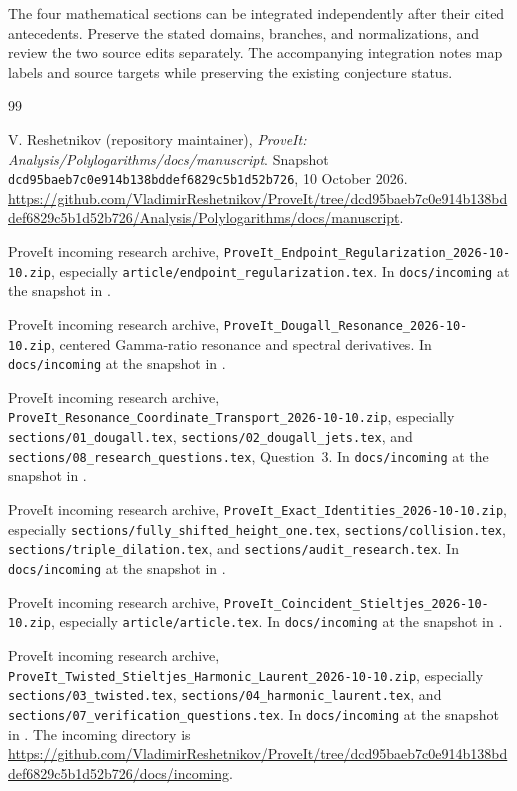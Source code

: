 \documentclass[11pt,a4paper]{article}
\numberwithin{equation}{section}
\theoremstyle{definition}
\theoremstyle{remark}
\newcommand{\src}[1]{\nolinkurl{#1}}
\begin{document}
The four mathematical sections can be integrated independently after
their cited antecedents. Preserve the stated domains, branches, and
normalizations, and review the two source edits separately.
The accompanying integration notes map labels and source targets
while preserving the existing conjecture status.

\clearpage
\begin{thebibliography}{99}
\raggedright
{}

V. Reshetnikov (repository maintainer),
\emph{ProveIt: Analysis/Polylogarithms/docs/manuscript}.
Snapshot \src{dcd95baeb7c0e914b138bddef6829c5b1d52b726},
10 October 2026.
\url{https://github.com/VladimirReshetnikov/ProveIt/tree/dcd95baeb7c0e914b138bddef6829c5b1d52b726/Analysis/Polylogarithms/docs/manuscript}.

ProveIt incoming research archive,
\src{ProveIt_Endpoint_Regularization_2026-10-10.zip},
especially \src{article/endpoint_regularization.tex}.
In \src{docs/incoming} at the snapshot in \cite{RepoMain}.

ProveIt incoming research archive,
\src{ProveIt_Dougall_Resonance_2026-10-10.zip},
centered Gamma-ratio resonance and spectral derivatives.
In \src{docs/incoming} at the snapshot in \cite{RepoMain}.

ProveIt incoming research archive,
\src{ProveIt_Resonance_Coordinate_Transport_2026-10-10.zip},
especially \src{sections/01_dougall.tex},
\src{sections/02_dougall_jets.tex}, and
\src{sections/08_research_questions.tex}, Question~3.
In \src{docs/incoming} at the snapshot in \cite{RepoMain}.

ProveIt incoming research archive,
\src{ProveIt_Exact_Identities_2026-10-10.zip},
especially \src{sections/fully_shifted_height_one.tex},
\src{sections/collision.tex}, \src{sections/triple_dilation.tex},
and \src{sections/audit_research.tex}.
In \src{docs/incoming} at the snapshot in \cite{RepoMain}.

ProveIt incoming research archive,
\src{ProveIt_Coincident_Stieltjes_2026-10-10.zip},
especially \src{article/article.tex}.
In \src{docs/incoming} at the snapshot in \cite{RepoMain}.

ProveIt incoming research archive,
\src{ProveIt_Twisted_Stieltjes_Harmonic_Laurent_2026-10-10.zip},
especially \src{sections/03_twisted.tex},
\src{sections/04_harmonic_laurent.tex}, and
\src{sections/07_verification_questions.tex}.
In \src{docs/incoming} at the snapshot in \cite{RepoMain}.
The incoming directory is
\url{https://github.com/VladimirReshetnikov/ProveIt/tree/dcd95baeb7c0e914b138bddef6829c5b1d52b726/docs/incoming}.


\end{thebibliography}
\end{document}
